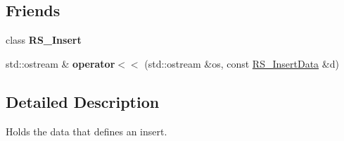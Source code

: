 \subsection*{Friends}
\begin{DoxyCompactItemize}
\item 
\hypertarget{classRS__InsertData_a940f92b7f2a8fbecbc033a4943010bbb}{class {\bfseries R\-S\-\_\-\-Insert}}\label{classRS__InsertData_a940f92b7f2a8fbecbc033a4943010bbb}

\item 
\hypertarget{classRS__InsertData_a0e22807d04c41a92719e30b07b6a2695}{std\-::ostream \& {\bfseries operator$<$$<$} (std\-::ostream \&os, const \hyperlink{classRS__InsertData}{R\-S\-\_\-\-Insert\-Data} \&d)}\label{classRS__InsertData_a0e22807d04c41a92719e30b07b6a2695}

\end{DoxyCompactItemize}


\subsection{Detailed Description}
Holds the data that defines an insert. 

